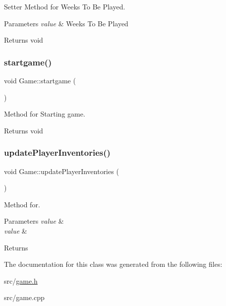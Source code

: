 Setter Method for Weeks To Be Played. 


\begin{DoxyParams}{Parameters}
{\em value} & Weeks To Be Played \\
\hline
\end{DoxyParams}
\begin{DoxyReturn}{Returns}
void 
\end{DoxyReturn}
\mbox{\label{classGame_a5cb92fa59d3d5e06c1b8f4349308b315}} 
\subsubsection{\texorpdfstring{startgame()}{startgame()}}
{\footnotesize\ttfamily void Game\+::startgame (\begin{DoxyParamCaption}{ }\end{DoxyParamCaption})}



Method for Starting game. 

\begin{DoxyReturn}{Returns}
void 
\end{DoxyReturn}
\mbox{\label{classGame_ac586db141ef21c992a6474300bdea2d0}} 
\subsubsection{\texorpdfstring{update\+Player\+Inventories()}{updatePlayerInventories()}}
{\footnotesize\ttfamily void Game\+::update\+Player\+Inventories (\begin{DoxyParamCaption}{ }\end{DoxyParamCaption})}



Method for. 


\begin{DoxyParams}{Parameters}
{\em value} & \\
\hline
{\em value} & \\
\hline
\end{DoxyParams}
\begin{DoxyReturn}{Returns}

\end{DoxyReturn}


The documentation for this class was generated from the following files\+:\begin{DoxyCompactItemize}
\item 
src/\hyperlink{game_8h}{game.\+h}\item 
src/game.\+cpp\end{DoxyCompactItemize}
